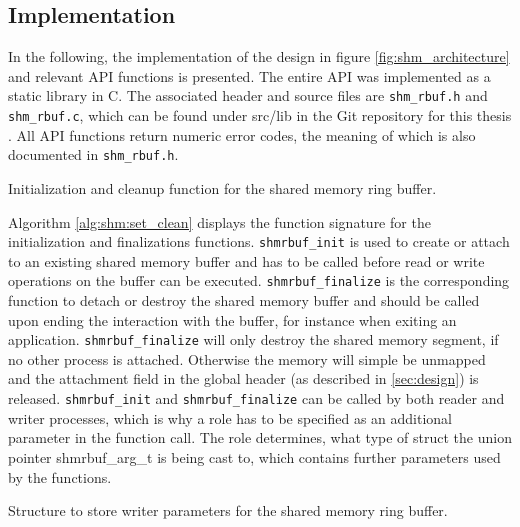 \subsection{Implementation}
In the following, the implementation of the design in figure \ref{fig:shm_architecture} and relevant API functions is presented.
The entire API was implemented as a static library in C. The associated header and source files are \texttt{shm\_rbuf.h} and \texttt{shm\_rbuf.c}, which can be found 
under src/lib in the Git repository for this thesis \cite{gitlab}. All API functions return numeric error codes, the meaning of which is also documented in \texttt{shm\_rbuf.h}.  
\par
\begin{algorithm}[h!]
    
    \label{alg:shm:set_clean}
    \caption[Shared Memory Ringbuffer: Initialization and Cleanup]{Initialization and cleanup function for the shared memory ring buffer.}
\end{algorithm}
Algorithm \ref{alg:shm:set_clean} displays the function signature for  the initialization and finalizations functions.
\texttt{shmrbuf\_init} is used to create or attach to an existing shared memory buffer and has to be called before read or write operations
on the buffer can be executed. \texttt{shmrbuf\_finalize} is the corresponding function to detach or destroy the shared memory buffer and should be called
upon ending the interaction with the buffer, for instance when exiting an application. \texttt{shmrbuf\_finalize} will only destroy the shared memory segment,
if no other process is attached. Otherwise the memory will simple be unmapped and the attachment field in the global header (as described in \ref{sec:design}) is released. 
\texttt{shmrbuf\_init} and \texttt{shmrbuf\_finalize} can be called by both reader and writer 
processes, which is why a role has to be specified as an additional parameter in the function call. The role determines, what type of struct the union pointer shmrbuf\_arg\_t is being cast to,
which contains further parameters used by the functions. 

\begin{algorithm}[h!]
    
    \label{alg:shm:writer_arg}
    \caption[Shared Memory Ringbuffer: Writer Parameters]{Structure to store writer parameters for the shared memory ring buffer.}
\end{algorithm}

